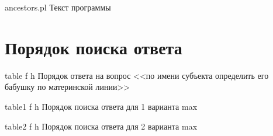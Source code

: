    {ancestors.pl}
    {Текст программы}

\clearpage

\section*{Порядок поиска ответа}

    {table}
    {f}
    {h}
    {\linewidth}
    {Порядок ответа на вопрос <<по имени субъекта определить его бабушку по материнской линии>>}

    {table1}
    {f}
    {h}
    {\linewidth}
    {Порядок поиска ответа для 1 варианта max}
	
    {table2}
    {f}
    {h}
    {\linewidth}
    {Порядок поиска ответа для 2 варианта max}

